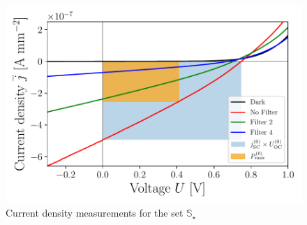 \begin{figure}[H]\centering
\includegraphics[width=\columnwidth]{../../../IV-Curve-Analysis/OSCPGraph.pdf}
\caption{Current density measurements for the set $\mathbb{S}_\star$}
\label{fig:OSCstarGraph}
\end{figure}

